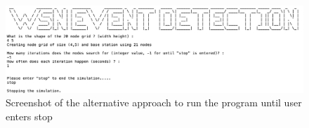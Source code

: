 \documentclass[conference]{IEEEtran}
\begin{document}
\begin{figure}[h]
	\centering
	\includegraphics[width=6in,keepaspectratio]{console2}
	\caption{Screenshot of the alternative approach to run the program until user enters stop}
	\label{screen 2}
\end{figure}
\end{document}
